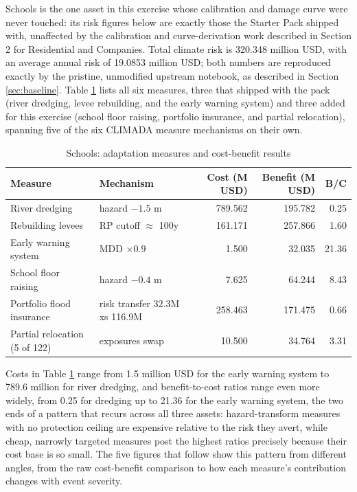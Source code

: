 \documentclass[11pt]{article}
\begin{document}
Schools is the one asset in this exercise whose calibration and damage curve were never
touched: its risk figures below are exactly those the Starter Pack shipped with, unaffected
by the calibration and curve-derivation work described in Section 2 for Residential and
Companies. Total climate risk is 320.348 million USD, with an average annual risk of
19.0853 million USD; both numbers are reproduced exactly by the pristine, unmodified
upstream notebook, as described in Section \ref{sec:baseline}. Table \ref{tab:schools}
lists all six measures, three that shipped with the pack (river dredging, levee
rebuilding, and the early warning system) and three added for this exercise (school floor
raising, portfolio insurance, and partial relocation), spanning five of the six CLIMADA
measure mechanisms on their own.

\begin{table}[H]
\centering
\caption{Schools: adaptation measures and cost-benefit results}
\label{tab:schools}
\begin{tabular}{p{3.6cm}p{3cm}rrr}
\toprule
Measure & Mechanism & Cost (M USD) & Benefit (M USD) & B/C \\
\midrule
River dredging & hazard $-1.5$ m & 789.562 & 195.782 & 0.25 \\
Rebuilding levees & RP cutoff $\approx$ 100y & 161.171 & 257.866 & 1.60 \\
Early warning system & MDD $\times 0.9$ & 1.500 & 32.035 & 21.36 \\
School floor raising & hazard $-0.4$ m & 7.625 & 64.244 & 8.43 \\
Portfolio flood insurance & risk transfer 32.3M xs 116.9M & 258.463 & 171.475 & 0.66 \\
Partial relocation (5 of 122) & exposures swap & 10.500 & 34.764 & 3.31 \\
\bottomrule
\end{tabular}
\end{table}

Costs in Table \ref{tab:schools} range from 1.5 million USD for the early warning system to
789.6 million for river dredging, and benefit-to-cost ratios range even more widely, from
0.25 for dredging up to 21.36 for the early warning system, the two ends of a pattern that
recurs across all three assets: hazard-transform measures with no protection ceiling are
expensive relative to the risk they avert, while cheap, narrowly targeted measures post the
highest ratios precisely because their cost base is so small. The five figures that follow
show this pattern from different angles, from the raw cost-benefit comparison to how each
measure's contribution changes with event severity.
\end{document}
